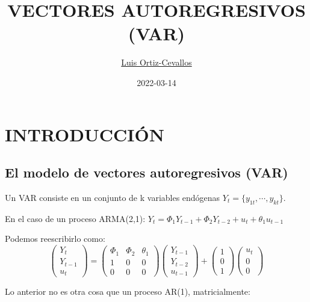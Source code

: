 \documentclass[
]{book}
\title{VECTORES AUTOREGRESIVOS (VAR)}
\author{\href{https://ortiz-cevallos.github.io/MYSELF/}{Luis Ortiz-Cevallos}}
\date{2022-03-14}
\begin{document}
\maketitle

{
\setcounter{tocdepth}{1}
\tableofcontents
}
\hypertarget{introducciuxf3n}{%
\chapter{INTRODUCCIÓN}\label{introducciuxf3n}}

\hypertarget{el-modelo-de-vectores-autoregresivos-var}{%
\section{El modelo de vectores autoregresivos (VAR)}\label{el-modelo-de-vectores-autoregresivos-var}}

Un VAR consiste en un conjunto de k variables endógenas \(Y_{t}=\{y_{1t},\cdots, y_{kt}\}\).

En el caso de un proceso ARMA(2,1):
\(Y_t = \Phi_1Y_{t-1} + \Phi_2Y_{t-2} + u_t + \theta_1u_{t-1}\)

Podemos reescribirlo como:
\begin{equation}
\left( \begin{array}{c}
Y_{t} \\
Y_{t-1} \\
u_{t} 
\end{array}
\right)=\left( \begin{array}{ccc}
\Phi_1 & \Phi_2 & \theta_1\\
1 & 0 & 0\\
0 & 0 & 0
\end{array}
\right) \left( \begin{array}{c}
Y_{t-1} \\
Y_{t-2} \\
u_{t-1} 
\end{array}
\right)+\left( \begin{array}{c}
1\\
0 \\
1
\end{array}
\right) \left( \begin{array}{c}
u_{t} \\
0 \\
0
\end{array}
\right) 
\nonumber
\end{equation}

Lo anterior no es otra cosa que un proceso AR(1), matricialmente:
\end{document}
